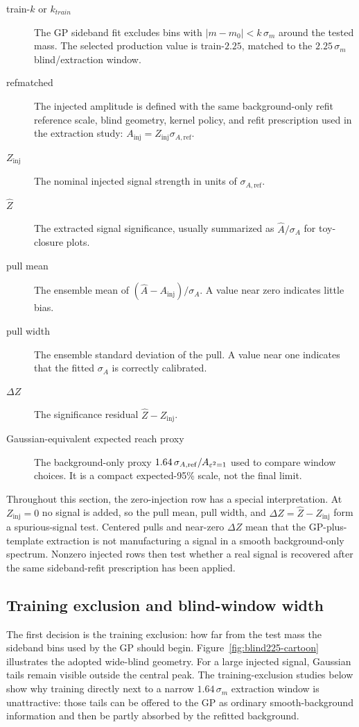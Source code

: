 \begin{description}
\item[train-$k$ or $k_{train}$] The GP sideband fit excludes bins with
$|m-m_0|<k\,\sigma_m$ around the tested mass. The selected production value is
train-$2.25$, matched to the $2.25\,\sigma_m$ blind/extraction window.
\item[refmatched] The injected amplitude is defined with the same
background-only refit reference scale, blind geometry, kernel policy, and refit
prescription used in the extraction study:
$A_{\mathrm{inj}}=Z_{\mathrm{inj}}\sigma_{A,\mathrm{ref}}$.
\item[$Z_{\mathrm{inj}}$] The nominal injected signal strength in units of
$\sigma_{A,\mathrm{ref}}$.
\item[$\hat Z$] The extracted signal significance, usually summarized as
$\hat A/\sigma_A$ for toy-closure plots.
\item[pull mean] The ensemble mean of
$(\hat A-A_{\mathrm{inj}})/\sigma_A$. A value near zero indicates little bias.
\item[pull width] The ensemble standard deviation of the pull. A value near one
indicates that the fitted $\sigma_A$ is correctly calibrated.
\item[$\Delta Z$] The significance residual $\hat Z-Z_{\mathrm{inj}}$.
\item[Gaussian-equivalent expected reach proxy] The background-only proxy
$1.64\,\sigma_{A,\mathrm{ref}}/A_{\varepsilon^2=1}$ used to compare window choices. It is a
compact expected-95\% scale, not the final \CLs{} limit.
\end{description}

Throughout this section, the zero-injection row has a special interpretation. At
$Z_{\mathrm{inj}}=0$ no signal is added, so the pull mean, pull width, and
$\Delta Z=\hat Z-Z_{\mathrm{inj}}$ form a spurious-signal test. Centered pulls and
near-zero $\Delta Z$ mean that the GP-plus-template extraction is not manufacturing a
signal in a smooth background-only spectrum. Nonzero injected rows then test whether a
real signal is recovered after the same sideband-refit prescription has been applied.

\subsection{Training exclusion and blind-window width}
\label{subsec:guard-band-construction}

The first decision is the training exclusion: how far from the test mass the sideband bins used by the GP should begin. Figure~\ref{fig:blind225-cartoon} illustrates the adopted wide-blind geometry. For a large injected signal, Gaussian tails remain visible outside the central peak. The training-exclusion studies below show why training directly next to a narrow $1.64\,\sigma_m$ extraction window is unattractive: those tails can be
offered to the GP as ordinary smooth-background information and then be partly absorbed
by the refitted background.

